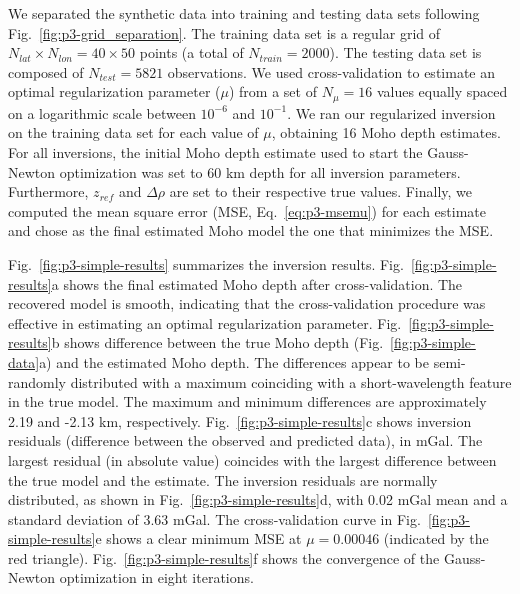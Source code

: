 We separated the synthetic data into training and testing data sets
following Fig.~\ref{fig:p3-grid_separation}.
The training data set is a regular grid of
$N_{lat} \times N_{lon} = 40 \times 50$ points
(a total of $N_{train} = 2000$).
The testing data set is composed of $N_{test} = 5821$ observations.
We used cross-validation to estimate an optimal regularization parameter ($\mu$)
from a set of $N_\mu = 16$ values equally spaced on a logarithmic scale
between $10^{-6}$ and $10^{-1}$.
We ran our regularized inversion on the training data set
for each value of $\mu$,
obtaining 16 Moho depth estimates.
For all inversions, the initial Moho depth estimate
used to start the Gauss-Newton optimization
was set to 60 km depth for all inversion parameters.
Furthermore, $z_{ref}$ and $\Delta\rho$ are set to their respective true values.
Finally, we computed the mean square error (MSE, Eq.~\ref{eq:p3-msemu})
for each estimate and chose as the final estimated Moho model
the one that minimizes the MSE.

Fig.~\ref{fig:p3-simple-results} summarizes the inversion results.
Fig.~\ref{fig:p3-simple-results}a shows the final estimated Moho depth
after cross-validation.
The recovered model is smooth, indicating that the cross-validation procedure
was effective in estimating an optimal regularization parameter.
Fig.~\ref{fig:p3-simple-results}b shows difference between the true Moho depth
(Fig.~\ref{fig:p3-simple-data}a) and the estimated Moho depth.
The differences appear to be semi-randomly distributed with a maximum
coinciding with a short-wavelength feature in the true model.
The maximum and minimum differences are approximately
2.19 and -2.13 km, respectively.
Fig.~\ref{fig:p3-simple-results}c shows inversion residuals (difference between
the observed and predicted data), in mGal.
The largest residual (in absolute value) coincides with the largest difference
between the true model and the estimate.
The inversion residuals are normally distributed,
as shown in Fig.~\ref{fig:p3-simple-results}d,
with 0.02 mGal mean and a standard deviation of 3.63 mGal.
The cross-validation curve in Fig.~\ref{fig:p3-simple-results}e
shows a clear minimum MSE at $\mu = 0.00046$
(indicated by the red triangle).
Fig.~\ref{fig:p3-simple-results}f shows the convergence of
the Gauss-Newton optimization in eight iterations.

